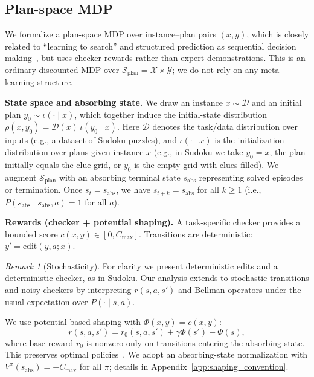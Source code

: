 \documentclass{article}
\theoremstyle{plain}
\theoremstyle{definition}
\theoremstyle{remark}
\newtheorem{remark}[theorem]{Remark}
\newcommand{\XX}{\mathcal{X}}
\newcommand{\YY}{\mathcal{Y}}
\newcommand{\SSS}{\mathcal{S}}
\begin{document}
{\subsection{Plan-space MDP}
\label{sec:meta_mdp}
We formalize a plan-space MDP over instance--plan pairs $(x,y)$, which is closely related to ``learning to search'' and structured prediction as sequential decision making~\citep{Daume2009SEARN,Ross2011DAgger,Chang2015LOLS}, but uses checker rewards rather than expert demonstrations.
This is an ordinary discounted MDP over $\SSS_{\mathrm{plan}}=\XX\times\YY$; we do not rely on any meta-learning structure.

\textbf{State space and absorbing state.}
We draw an instance $x \sim \mathcal{D}$ and an initial plan $y_0 \sim \iota(\cdot \mid x)$, which together induce the initial-state distribution $\rho(x,y_0)=\mathcal{D}(x)\,\iota(y_0\mid x)$.
Here $\mathcal{D}$ denotes the task/data distribution over inputs (e.g., a dataset of Sudoku puzzles), and $\iota(\cdot \mid x)$ is the initialization distribution over plans given instance $x$ (e.g., in Sudoku we take $y_0=x$, the plan initially equals the clue grid, or $y_0$ is the empty grid with clues filled).
We augment $\SSS_{\mathrm{plan}}$ with an absorbing terminal state $s_{\mathrm{abs}}$ representing solved episodes or termination.
Once $s_t=s_{\mathrm{abs}}$, we have $s_{t+k}=s_{\mathrm{abs}}$ for all $k\ge 1$ (i.e., $P(s_{\mathrm{abs}}\mid s_{\mathrm{abs}},a)=1$ for all $a$).

\textbf{Rewards (checker + potential shaping).}
A task-specific checker provides a bounded score $c(x,y)\in[0,C_{\max}]$.
Transitions are deterministic: $y'=\mathrm{edit}(y,a;x)$.
\begin{remark}[Stochasticity]
For clarity we present deterministic edits and a deterministic checker, as in Sudoku.
Our analysis extends to stochastic transitions and noisy checkers by interpreting $r(s,a,s')$ and Bellman operators under the usual expectation over $P(\cdot\mid s,a)$.
\end{remark}


We use potential-based shaping with $\Phi(x,y)=c(x,y)$:
\begin{equation}
r(s,a,s') = r_0(s,a,s') + \gamma \Phi(s') - \Phi(s),
\label{eq:shaping}
\end{equation}
where base reward $r_0$ is nonzero only on transitions entering the absorbing state.
This preserves optimal policies~\citep{Ng1999Shaping}.
We adopt an absorbing-state normalization with $V^\pi(s_{\mathrm{abs}})=-C_{\max}$ for all $\pi$; details in Appendix~\ref{app:shaping_convention}.

}
\end{document}
